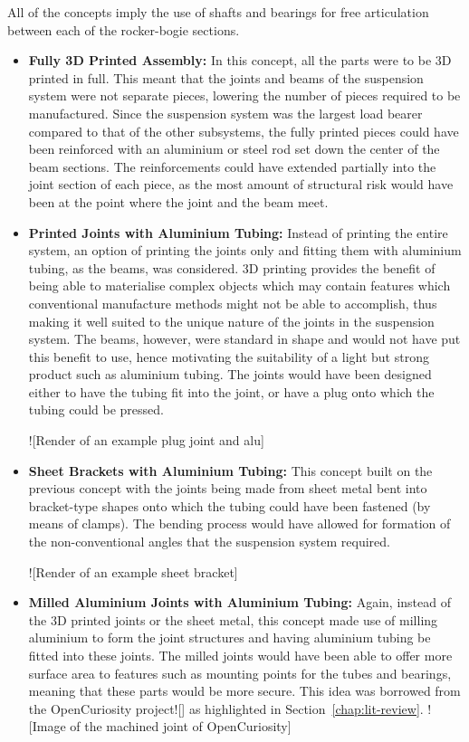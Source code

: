       All of the concepts imply the use of shafts and bearings for free articulation between each of the rocker-bogie sections.
      
      \begin{itemize}
        \item \textbf{Fully 3D Printed Assembly:} In this concept, all the parts were to be 3D printed in full. This meant that the joints and beams of the suspension system were not separate pieces, lowering the number of pieces required to be manufactured. Since the suspension system was the largest load bearer compared to that of the other subsystems, the fully printed pieces could have been reinforced with an aluminium or steel rod set down the center of the beam sections. The reinforcements could have extended partially into the joint section of each piece, as the most amount of structural risk would have been at the point where the joint and the beam meet.
        
        \item \textbf{Printed Joints with Aluminium Tubing:} Instead of printing the entire system, an option of printing the joints only and fitting them with aluminium tubing, as the beams, was considered. 3D printing provides the benefit of being able to materialise complex objects which may contain features which conventional manufacture methods might not be able to accomplish, thus making it well suited to the unique nature of the joints in the suspension system. The beams, however, were standard in shape and would not have put this benefit to use, hence motivating the suitability of a light but strong product such as aluminium tubing. The joints would have been designed either to have the tubing fit into the joint, or have a plug onto which the tubing could be pressed.
      
        ![Render of an example plug joint and alu]
      
        \item \textbf{Sheet Brackets with Aluminium Tubing:} This concept built on the previous concept with the joints being made from sheet metal bent into bracket-type shapes onto which the tubing could have been fastened (by means of clamps). The bending process would have allowed for formation of the non-conventional angles that the suspension system required.
        
        ![Render of an example sheet bracket]
        
        \item \textbf{Milled Aluminium Joints with Aluminium Tubing:} Again, instead of the 3D printed joints or the sheet metal, this concept made use of milling aluminium to form the joint structures and having aluminium tubing be fitted into these joints. The milled joints would have been able to offer more surface area to features such as mounting points for the tubes and bearings, meaning that these parts would be more secure. This idea was borrowed from the OpenCuriosity project![] as highlighted in Section~\ref{chap:lit-review}.
        ![Image of the machined joint of OpenCuriosity]
      \end{itemize}

